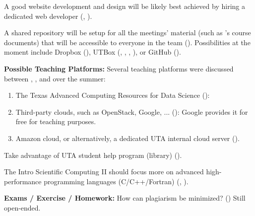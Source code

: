 {            A good website development and design will be likely best achieved by hiring a dedicated web developer (\amirf, \amirs). 

        \item
            A shared repository will be setup for all the meetings' material (such as \li's course documents) that will be accessible to everyone in the team (\amirf). Possibilities at the moment include Dropbox (\leili), UTBox (\li, \amirf, \amirs, \leili), or GitHub (\amirf).

        \item
            {\bf Possible Teaching Platforms:} 
            Several teaching platforms were discussed between \amirf, \amirs, and \leili over the summer:
            \begin{enumerate}
                \item
                    The Texas Advanced Computing Resources for Data Science (\amirs):
                \item
                    Third-party clouds, such as OpenStack, Google, ... (\leili): Google provides it for free for teaching purposes.
                \item
                    Amazon cloud, or alternatively, a dedicated UTA internal cloud server (\amirf).
            \end{enumerate}

        \item
            Take advantage of UTA student help program (library) (\leili).

        \item
            The Intro Scientific Computing II should focus more on advanced high-performance programming languages (C/C++/Fortran) (\daniel, \amirs).

        \item
            {\bf Exams / Exercise / Homework:} How can plagiarism be minimized? (\amirf) Still open-ended.

            
    }

